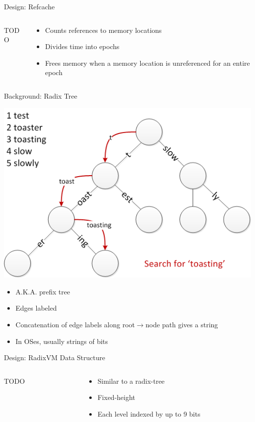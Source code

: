 \documentclass[aspectratio=169]{beamer}
\newcommand{\bi}{\begin{itemize}}
\newcommand{\ei}{\end{itemize}}
\begin{document}
\begin{frame}{Design: Refcache}
  \begin{columns}[T]
    \begin{column}{0.2\textwidth}
      TODO
    \end{column}
    \begin{column}{0.8\textwidth}
      \bi
    \item Counts references to memory locations
    \item Divides time into epochs
    \item Frees memory when a memory location is unreferenced for an entire epoch
      \ei
    \end{column}
  \end{columns}
\end{frame}

\begin{frame}{Background: Radix Tree}
  \begin{center}
    \includegraphics[scale=0.5]{./figures/Patricia_trie.png}
    \bi
  \item A.K.A. prefix tree
  \item Edges labeled
  \item Concatenation of edge labels along root$\rightarrow$node path gives a string
  \item In OSes, usually strings of bits
    \ei
  \end{center}
\end{frame}

\begin{frame}{Design: RadixVM Data Structure}
  \begin{columns}[T]
    \begin{column}{0.2\textwidth}
      TODO
    \end{column}
    \begin{column}{0.8\textwidth}
      \bi
    \item Similar to a radix-tree
    \item Fixed-height
    \item Each level indexed by up to 9 bits
      \ei
    \end{column}
  \end{columns}
\end{frame}
\end{document}
